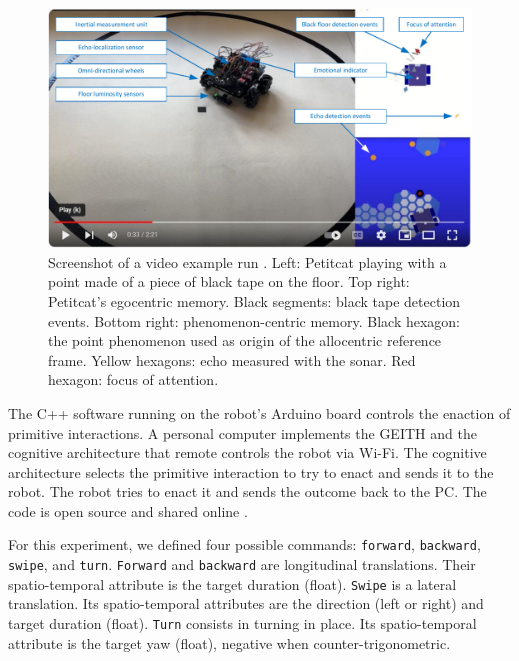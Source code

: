 \documentclass[runningheads]{llncs}
\begin{document}
\begin{figure}
	\includegraphics[width=\textwidth]{Figure_video.pdf}
	\caption{Screenshot of a video example run \cite{georgeon_petitcat_2024}.
		Left: Petitcat playing with a point made of a piece of black tape on the floor.
		Top right: Petitcat's egocentric memory. Black segments: black tape detection events. 
		Bottom right: phenomenon-centric memory. 
		Black hexagon: the point phenomenon used as origin of the allocentric reference frame. 
		Yellow hexagons: echo measured with the sonar. Red hexagon: focus of attention.} \label{fig:video}
\end{figure}

The C++ software running on the robot's Arduino board controls the enaction of primitive interactions. 
A personal computer implements the GEITH and the cognitive architecture that remote controls the robot via Wi-Fi.
The cognitive architecture selects the primitive interaction to try to enact and sends it to the robot. 
The robot tries to enact it and sends the outcome back to the PC.  
The code is open source and shared online \cite{petitcat_github}.

For this experiment, we defined four possible commands: \texttt{forward}, \texttt{backward}, \texttt{swipe}, and \texttt{turn}. 
\texttt{Forward} and \texttt{backward} are longitudinal translations. Their spatio-temporal attribute is the target duration (float).   
\texttt{Swipe} is a lateral translation. Its spatio-temporal attributes are the direction (left or right) and target duration (float). 
\texttt{Turn} consists in turning in place. Its spatio-temporal attribute is the target yaw (float), negative when counter-trigonometric. 
\end{document}
